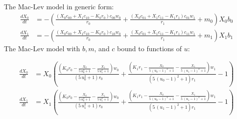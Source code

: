 \documentclass{article}
\begin{document}
The Mac-Lev model in generic form: 
\[\begin{align*}
\frac{dX_{0}}{dt} &= -{\left(\frac{{\left(X_{0} c_{00} + X_{1} c_{10} - K_{0} r_{0}\right)} c_{00} w_{0}}{r_{0}} + \frac{{\left(X_{0} c_{01} + X_{1} c_{11} - K_{1} r_{1}\right)} c_{01} w_{1}}{r_{1}} + m_{0}\right)} X_{0} b_{0}\\
\frac{dX_{1}}{dt} &= -{\left(\frac{{\left(X_{0} c_{00} + X_{1} c_{10} - K_{0} r_{0}\right)} c_{10} w_{0}}{r_{0}} + \frac{{\left(X_{0} c_{01} + X_{1} c_{11} - K_{1} r_{1}\right)} c_{11} w_{1}}{r_{1}} + m_{1}\right)} X_{1} b_{1}
\end{align*} \
\]
The Mac-Lev model with $b, m$, and $c$ bound to functions of $u$:

\[\begin{align*}
\frac{dX_{0}}{dt} &= X_{0} {\left(\frac{{\left(K_{0} r_{0} - \frac{X_{0}}{5 \, u_{0}^{2} + 1} - \frac{X_{1}}{5 \, u_{1}^{2} + 1}\right)} w_{0}}{{\left(5 \, u_{0}^{2} + 1\right)} r_{0}} + \frac{{\left(K_{1} r_{1} - \frac{X_{0}}{5 \, {\left(u_{0} - 1\right)}^{2} + 1} - \frac{X_{1}}{5 \, {\left(u_{1} - 1\right)}^{2} + 1}\right)} w_{1}}{{\left(5 \, {\left(u_{0} - 1\right)}^{2} + 1\right)} r_{1}} - 1\right)}\\
\frac{dX_{1}}{dt} &= X_{1} {\left(\frac{{\left(K_{0} r_{0} - \frac{X_{0}}{5 \, u_{0}^{2} + 1} - \frac{X_{1}}{5 \, u_{1}^{2} + 1}\right)} w_{0}}{{\left(5 \, u_{1}^{2} + 1\right)} r_{0}} + \frac{{\left(K_{1} r_{1} - \frac{X_{0}}{5 \, {\left(u_{0} - 1\right)}^{2} + 1} - \frac{X_{1}}{5 \, {\left(u_{1} - 1\right)}^{2} + 1}\right)} w_{1}}{{\left(5 \, {\left(u_{1} - 1\right)}^{2} + 1\right)} r_{1}} - 1\right)}
\end{align*} \
\]
\end{document}
